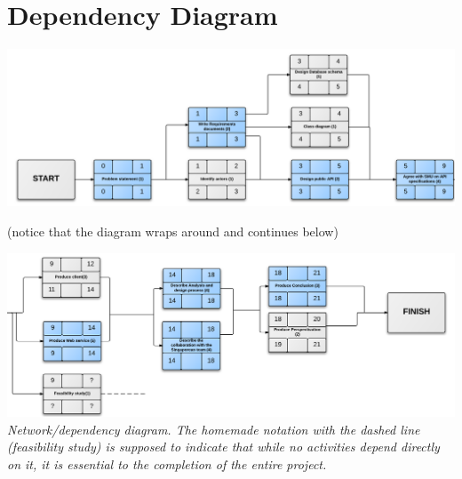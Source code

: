 \section{Dependency Diagram}
\label{app:dependencydiagram}

\includegraphics[scale=0.2]{./Appendices/networkdiag-p1.png}

(notice that the diagram wraps around and continues below)

\includegraphics[scale=0.2]{./Appendices/networkdiag-p2.png}
\emph{Network/dependency diagram. The homemade notation with the dashed line
(feasibility study) is supposed to indicate that while no activities depend
directly on it, it is essential to the completion of the entire project.}
